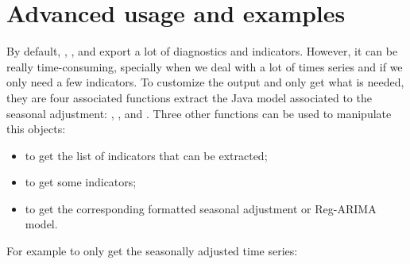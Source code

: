 \documentclass[article]{jss}
\providecommand{\tightlist}{%
  \setlength{\itemsep}{0pt}\setlength{\parskip}{0pt}}
\begin{document}
\hypertarget{advanced-usage-and-examples}{%
\section{Advanced usage and
examples}\label{advanced-usage-and-examples}}

By default, , ,  and
 export a lot of diagnostics and indicators.
However, it can be really time-consuming, specially when we deal with a
lot of times series and if we only need a few indicators. To customize
the output and only get what is needed, they are four associated
functions extract the Java model associated to the seasonal adjustment:
, ,  and
. Three other functions can be used to
manipulate this objects:

\begin{itemize}
\tightlist
\item
   to get the list of indicators that can be
  extracted;\\
\item
   to get some indicators;\\
\item
   to get the corresponding formatted seasonal adjustment
  or Reg-ARIMA model.
\end{itemize}

For example to only get the seasonally adjusted time series:
\end{document}
